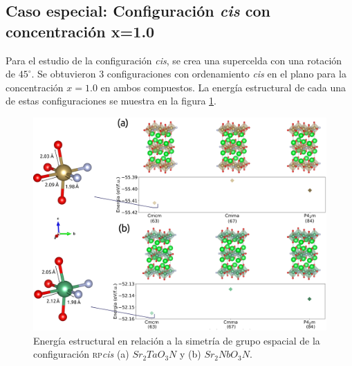 \subsection{Caso especial: Configuración \emph{cis} con concentración x=1.0}

Para el estudio de la configuración \emph{cis}, se crea una supercelda con una rotación de $45^{\circ}$. Se obtuvieron 3 configuraciones con ordenamiento \emph{cis} en el plano para la concentración $x=1.0$ en ambos compuestos. La energía estructural de cada una de estas configuraciones se muestra en la figura \ref{Fig. rp_cis}.

\begin{figure}[H]
    \centering
    \includegraphics[width=\textwidth]{Figs/cis_energy_Ta.png}
    \caption{Energía estructural en relación a la simetría de grupo espacial de la configuración \textsc{rp}\emph{cis} (a) $Sr_{2}TaO_{3}N$ y (b) $Sr_{2}NbO_{3}N$.}
    \label{Fig. rp_cis}
\end{figure}


